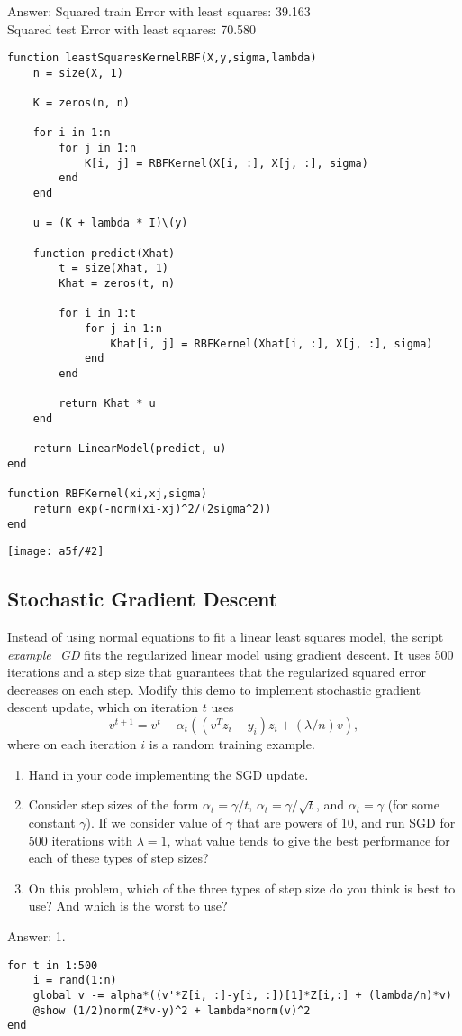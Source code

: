\documentclass{article}
\def\ans#1{\par\gre{Answer: #1}}
\def\blu#1{{\color{blu}#1}}
\def\gre#1{{\color{gre}#1}}
\newcommand{\fig}[2]{\texttt{[image: a5f/\#2]}}
\def\enum#1{\begin{enumerate}#1\end{enumerate}}
\begin{document}
\ans{Squared train Error with least squares: 39.163\\
Squared test Error with least squares: 70.580}
\begin{lstlisting}
function leastSquaresKernelRBF(X,y,sigma,lambda)
	n = size(X, 1)

	K = zeros(n, n)

	for i in 1:n
		for j in 1:n
			K[i, j] = RBFKernel(X[i, :], X[j, :], sigma)
		end
	end
	
	u = (K + lambda * I)\(y)

	function predict(Xhat)
		t = size(Xhat, 1)
		Khat = zeros(t, n)

		for i in 1:t
			for j in 1:n
				Khat[i, j] = RBFKernel(Xhat[i, :], X[j, :], sigma)
			end
		end

		return Khat * u
	end
	
	return LinearModel(predict, u)
end

function RBFKernel(xi,xj,sigma)
	return exp(-norm(xi-xj)^2/(2sigma^2))
end
\end{lstlisting}
\fig{1}{Q1.3}


\pagebreak
\subsection{Stochastic Gradient Descent}

Instead of using normal equations to fit a linear least squares model, the script \emph{example\_GD} fits the regularized linear model using gradient descent. It uses 500 iterations and a step size that guarantees that the regularized squared error decreases on each step. Modify this demo to implement stochastic gradient descent update, which on iteration $t$ uses
\[
v^{t+1} = v^t - \alpha_t ((v^Tz_i - y_i)z_i + (\lambda/n)v),
\]
where on each iteration $i$ is a random training example.
\enum{
\item \blu{Hand in your code implementing the SGD update.}
\item Consider step sizes of the form $\alpha_t = \gamma/t$, $\alpha_t = \gamma/\sqrt{t}$, and $\alpha_t = \gamma$ (for some constant $\gamma$). If we consider value of $\gamma$ that are powers of 10, and run SGD for 500 iterations with $\lambda=1$, \blu{what value tends to give the best performance for each of these types of step sizes}?
\item On this problem, \blu{which of the three types of step size do you think is best to use? And which is the worst to use?}
}

\ans{1. }
\begin{lstlisting}
for t in 1:500
	i = rand(1:n)
	global v -= alpha*((v'*Z[i, :]-y[i, :])[1]*Z[i,:] + (lambda/n)*v)
	@show (1/2)norm(Z*v-y)^2 + lambda*norm(v)^2
end
\end{lstlisting}
\end{document}
